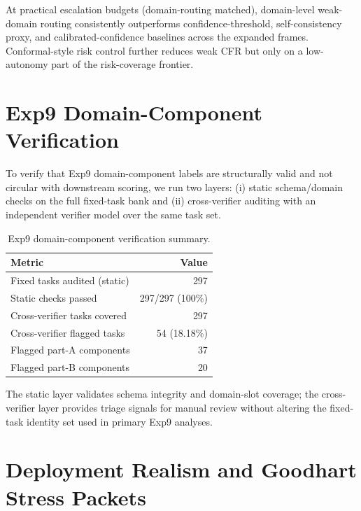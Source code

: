 \documentclass[10pt]{article}
\begin{document}
At practical escalation budgets (domain-routing matched), domain-level weak-domain
routing consistently outperforms confidence-threshold, self-consistency proxy,
and calibrated-confidence baselines across the expanded frames. Conformal-style
risk control further reduces weak CFR but only on a low-autonomy part of the
risk-coverage frontier.

\section{Exp9 Domain-Component Verification}
\label{app:exp9-mapping-validity}

To verify that Exp9 domain-component labels are structurally valid and not
circular with downstream scoring, we run two layers: (i) static schema/domain
checks on the full fixed-task bank and (ii) cross-verifier auditing with an
independent verifier model over the same task set.

\begin{table}[h]
\centering
\caption{Exp9 domain-component verification summary.}
\label{tab:exp9-mapping-validity}
\small
\begin{tabular}{lr}
\toprule
Metric & Value \\
\midrule
Fixed tasks audited (static) & 297 \\
Static checks passed & 297/297 (100\%) \\
Cross-verifier tasks covered & 297 \\
Cross-verifier flagged tasks & 54 (18.18\%) \\
Flagged part-A components & 37 \\
Flagged part-B components & 20 \\
\bottomrule
\end{tabular}
\end{table}

The static layer validates schema integrity and domain-slot coverage; the
cross-verifier layer provides triage signals for manual review without altering
the fixed-task identity set used in primary Exp9 analyses.

\section{Deployment Realism and Goodhart Stress Packets}
\label{app:deployment-realism}
\end{document}
